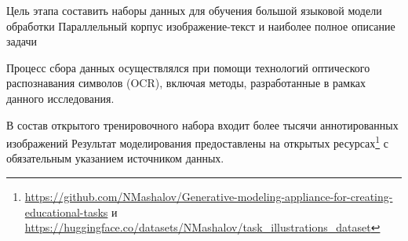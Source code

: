 Цель этапа составить наборы данных для обучения большой языковой модели обработки
Параллельный корпус изображение-текст и наиболее полное описание задачи

Процесс сбора данных осуществлялся при помощи технологий оптического распознавания символов (OCR), 
включая методы, разработанные в рамках данного исследования.

В состав открытого тренировочного набора входит более тысячи аннотированных изображений  
Результат моделирования предоставлены на открытых ресурсах\footnote{
\url{https://github.com/NMashalov/Generative-modeling-appliance-for-creating-educational-tasks}
и \url{https://huggingface.co/datasets/NMashalov/task_illustrations_dataset}
} с обязательным указанием источником данных.
